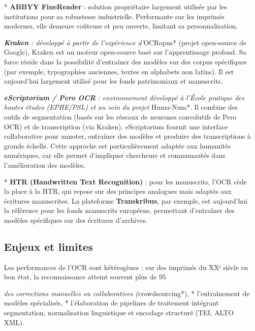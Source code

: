 * \textbf{ABBYY FineReader} : solution propriétaire largement utilisée par les institutions pour sa robustesse industrielle. Performante sur les imprimés modernes, elle demeure coûteuse et peu ouverte, limitant sa personnalisation.

\emph{ \textbf{Kraken} : développé à partir de l’expérience d’}OCRopus* (projet open-source de Google), Kraken est un moteur open-source basé sur l’apprentissage profond. Sa force réside dans la possibilité d’entraîner des modèles sur des corpus spécifiques (par exemple, typographies anciennes, textes en alphabets non latins). Il est aujourd’hui largement utilisé pour les fonds patrimoniaux et manuscrits.

\emph{ \textbf{eScriptorium / Pero OCR} : environnement développé à l’École pratique des hautes études (EPHE/PSL) et au sein du projet }Huma-Num*. Il combine des outils de segmentation (basés sur les réseaux de neurones convolutifs de Pero OCR) et de transcription (via Kraken). eScriptorium fournit une interface collaborative pour annoter, entraîner des modèles et produire des transcriptions à grande échelle. Cette approche est particulièrement adaptée aux humanités numériques, car elle permet d’impliquer chercheurs et communautés dans l’amélioration des modèles.

* \textbf{HTR (Handwritten Text Recognition)} : pour les manuscrits, l’OCR cède la place à la HTR, qui repose sur des principes analogues mais adaptés aux écritures manuscrites. La plateforme \textbf{Transkribus}, par exemple, est aujourd’hui la référence pour les fonds manuscrits européens, permettant d’entraîner des modèles spécifiques sur des écritures d’archives.

\subsection{Enjeux et limites}

Les performances de l’OCR sont hétérogènes : sur des imprimés du XXᵉ siècle en bon état, la reconnaissance atteint souvent plus de 95 %

\emph{ des corrections manuelles ou collaboratives (}crowdsourcing*),
* l’entraînement de modèles spécialisés,
* l’élaboration de pipelines de traitement intégrant segmentation, normalisation linguistique et encodage structuré (TEI, ALTO XML).

